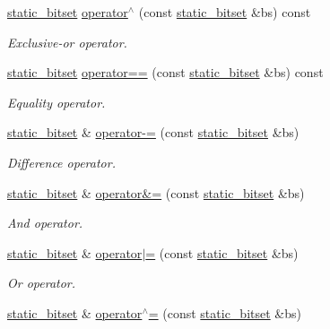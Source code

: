 \begin{DoxyCompactItemize}
\hyperlink{classlgraph_1_1utils_1_1static__bitset}{static\+\_\+bitset} \hyperlink{classlgraph_1_1utils_1_1static__bitset_ad1073ab23820db5711c279ef5d3fce67}{operator$^\wedge$} (const \hyperlink{classlgraph_1_1utils_1_1static__bitset}{static\+\_\+bitset} \&bs) const 
\begin{DoxyCompactList}\small\item\em Exclusive-\/or operator. \end{DoxyCompactList}\item 
\hyperlink{classlgraph_1_1utils_1_1static__bitset}{static\+\_\+bitset} \hyperlink{classlgraph_1_1utils_1_1static__bitset_a8217792890f175c8f83ca5c9aae96b34}{operator==} (const \hyperlink{classlgraph_1_1utils_1_1static__bitset}{static\+\_\+bitset} \&bs) const 
\begin{DoxyCompactList}\small\item\em Equality operator. \end{DoxyCompactList}\item 
\hyperlink{classlgraph_1_1utils_1_1static__bitset}{static\+\_\+bitset} \& \hyperlink{classlgraph_1_1utils_1_1static__bitset_af4f4a29642e50b6efa406d5f772a0e69}{operator-\/=} (const \hyperlink{classlgraph_1_1utils_1_1static__bitset}{static\+\_\+bitset} \&bs)
\begin{DoxyCompactList}\small\item\em Difference operator. \end{DoxyCompactList}\item 
\hyperlink{classlgraph_1_1utils_1_1static__bitset}{static\+\_\+bitset} \& \hyperlink{classlgraph_1_1utils_1_1static__bitset_aa85ff92bfb53eb3ed2fb2e1bc932ac98}{operator\&=} (const \hyperlink{classlgraph_1_1utils_1_1static__bitset}{static\+\_\+bitset} \&bs)
\begin{DoxyCompactList}\small\item\em And operator. \end{DoxyCompactList}\item 
\hyperlink{classlgraph_1_1utils_1_1static__bitset}{static\+\_\+bitset} \& \hyperlink{classlgraph_1_1utils_1_1static__bitset_a62330084392296754cfc5e525d99cab2}{operator$\vert$=} (const \hyperlink{classlgraph_1_1utils_1_1static__bitset}{static\+\_\+bitset} \&bs)
\begin{DoxyCompactList}\small\item\em Or operator. \end{DoxyCompactList}\item 
\hyperlink{classlgraph_1_1utils_1_1static__bitset}{static\+\_\+bitset} \& \hyperlink{classlgraph_1_1utils_1_1static__bitset_a2f07c03e35d9a5661cf573ed1eb379a6}{operator$^\wedge$=} (const \hyperlink{classlgraph_1_1utils_1_1static__bitset}{static\+\_\+bitset} \&bs)

\end{DoxyCompactItemize}
